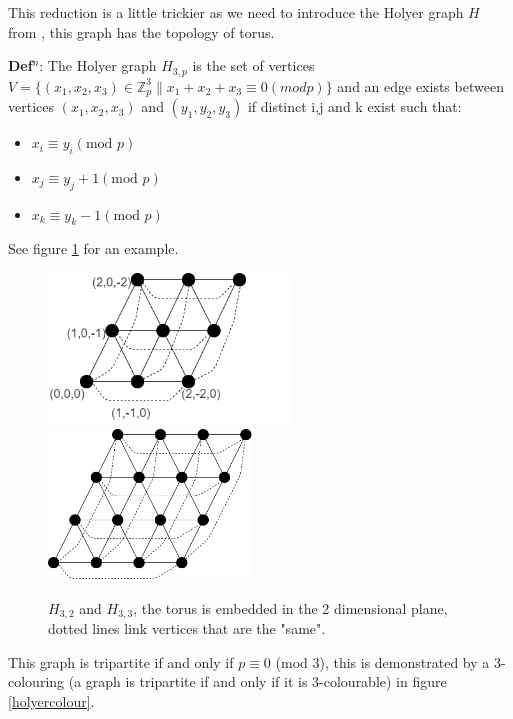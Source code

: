\documentclass[a4paper,11pt]{report}
\newcounter{col}
\begin{document}
This reduction is a little trickier as we need to introduce the Holyer graph $H$ from \cite{holyer}, this graph has the topology of torus.

\textbf{Def$^n$}: The Holyer graph $H_{3,p}$ is the set of vertices $V=\{(x_1,x_2,x_3)\in \mathbb{Z}_p^3 \| x_1+x_2+x_3 \equiv 0 (mod p)\}$ and an edge exists between vertices $(x_1,x_2,x_3)$ and $(y_1,y_2,y_3)$ if distinct i,j and k exist such that:
\begin{itemize}
\item $x_i\equiv y_i (\text{mod }p)$
\item $x_j\equiv y_j+1 (\text{mod }p)$
\item $x_k\equiv y_k-1 (\text{mod }p)$
\end{itemize}
See figure \ref{holyer} for an example.

\begin{figure}[h!]
\begin{center}
		\includegraphics[height=40mm]{figures/holyer_coord.png}
		\includegraphics[height=40mm]{figures/holyer_3_4.png}
\end{center}
		\caption{$H_{3,2} $ and $H_{3,3}$, the torus is embedded in the 2 dimensional plane, dotted lines link vertices that are the "same".}
		\label{holyer}
\end{figure}

This graph is tripartite if and only if $p\equiv 0 $ (mod 3), this is demonstrated by a 3-colouring (a graph is tripartite if and only if it is 3-colourable) in figure \ref{holyercolour}.
\end{document}

